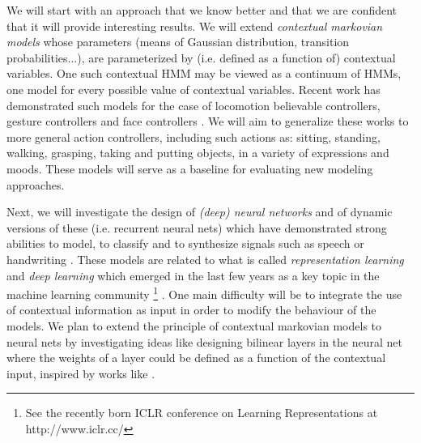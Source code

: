  
We will start with an approach that we know better and that we are confident that it will provide interesting results. We will extend {\it contextual markovian models} whose parameters (means of Gaussian distribution, transition probabilities...), are parameterized by (i.e. defined as a function of) contextual variables. One such contextual HMM may be viewed as a continuum of HMMs, one model for every possible value of contextual variables. Recent work has demonstrated such models for the case of locomotion believable controllers, gesture controllers \cite{DBLP:journals/tog/LevineKTK10} and face controllers \cite{Radenen2014, Ding2013, Ding2014}. We will aim to generalize these works to more general action controllers, including such actions as: sitting, standing, walking, grasping, taking and putting objects, in a variety of expressions and moods. These models will serve as a baseline for evaluating new modeling approaches.



 Next, we will investigate the design of {\it (deep) neural networks} and of dynamic versions of these (i.e. recurrent neural nets) which have demonstrated strong abilities to model, to classify and to synthesize signals such as speech or handwriting \cite{DBLP:journals/taslp/Abdel-HamidMJDPY14,DBLP:journals/corr/abs-1303-5778,DBLP:conf/interspeech/Abdel-HamidDYJ13,DBLP:journals/spm/LingKZSSQMD15, DBLP:conf/nips/GravesS08,DBLP:journals/corr/Graves13}. These models are related to what is called {\it representation learning} and {\it deep learning} which emerged in the last few years as a key topic in the machine learning community \footnote{See the recently born ICLR conference on Learning Representations at http://www.iclr.cc/} \cite{DBLP:journals/corr/ContardoDAG13}.  One main difficulty will be to integrate the use of contextual information as input in order to modify the behaviour of the models. We plan to extend the principle of contextual markovian models to neural nets by investigating ideas like designing bilinear layers in the neural net where the weights of a layer could be defined as a function of the contextual input, inspired by works like \cite{DBLP:conf/mm/ZhongLL11, DBLP:journals/pami/HutchinsonDY13}.

